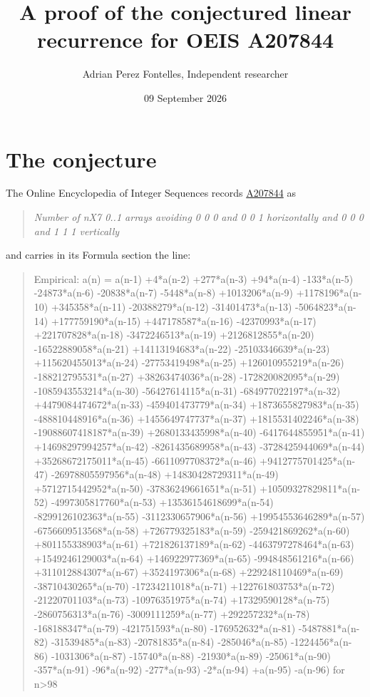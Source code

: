 \documentclass[11pt]{article}
\title{A proof of the conjectured linear recurrence for OEIS A207844}
\author{Adrian Perez Fontelles, Independent researcher}
\date{09 September 2026}
\theoremstyle{definition}
\begin{document}
\maketitle
\section{The conjecture}

The Online Encyclopedia of Integer Sequences records \href{https://oeis.org/A207844}{A207844} as

\begin{quote}\itshape Number of nX7 0..1 arrays avoiding 0 0 0 and 0 0 1 horizontally and 0 0 0 and 1 1 1 vertically\end{quote}

and carries in its Formula section the line:

\begin{quote}\ttfamily Empirical: a(n) = a(n-1) +4*a(n-2) +277*a(n-3) +94*a(n-4) -133*a(n-5) -24873*a(n-6) -20838*a(n-7) -5448*a(n-8) +1013206*a(n-9) +1178196*a(n-10) +345358*a(n-11) -20388279*a(n-12) -31401473*a(n-13) -5064823*a(n-14) +177759190*a(n-15) +447178587*a(n-16) -42370993*a(n-17) +221707828*a(n-18) -3472246513*a(n-19) +2126812855*a(n-20) -16522889058*a(n-21) +14113194683*a(n-22) -25103346639*a(n-23) +115620455013*a(n-24) -27753419498*a(n-25) +126010955219*a(n-26) -188212795531*a(n-27) +38263474036*a(n-28) -172820082095*a(n-29) -1085943553214*a(n-30) -56427614115*a(n-31) -684977022197*a(n-32) +4479084474672*a(n-33) -459401473779*a(n-34) +1873655827983*a(n-35) -488810448916*a(n-36) +1455649747737*a(n-37) +1815531402246*a(n-38) -19088607418187*a(n-39) +2680133435998*a(n-40) -6417644855951*a(n-41) +14698297994257*a(n-42) -8261435689958*a(n-43) -3728425944069*a(n-44) +35268672175011*a(n-45) -6611097708372*a(n-46) +9412775701425*a(n-47) -26978805597956*a(n-48) +14830428729311*a(n-49) +5712715442952*a(n-50) -37836249661651*a(n-51) +10509327829811*a(n-52) -4997305817760*a(n-53) +13536154618699*a(n-54) -8299126102363*a(n-55) -3112330657906*a(n-56) +19954553646289*a(n-57) -6756609513568*a(n-58) +726779325183*a(n-59) -259421869262*a(n-60) +801155338903*a(n-61) +721826137189*a(n-62) -4463797278464*a(n-63) +1549246129003*a(n-64) +146922977369*a(n-65) -994848561216*a(n-66) +311012884307*a(n-67) +3524197306*a(n-68) +229248110469*a(n-69) -38710430265*a(n-70) -17234211018*a(n-71) +122761803753*a(n-72) -21220701103*a(n-73) -10976351975*a(n-74) +17329590128*a(n-75) -2860756313*a(n-76) -3009111259*a(n-77) +292257232*a(n-78) -168188347*a(n-79) -421751593*a(n-80) -176952632*a(n-81) -5487881*a(n-82) -31539485*a(n-83) -20781835*a(n-84) -285046*a(n-85) -1224456*a(n-86) -1031306*a(n-87) -15740*a(n-88) -21930*a(n-89) -25061*a(n-90) -357*a(n-91) -96*a(n-92) -277*a(n-93) -2*a(n-94) +a(n-95) -a(n-96) for n>98\end{quote}
\end{document}
